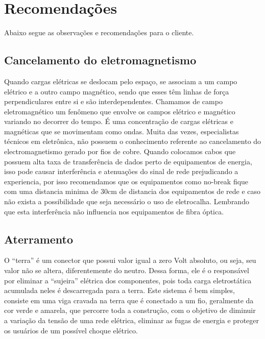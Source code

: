 \documentclass[	DIV=calc,%
							paper=a4,%
							fontsize=12pt,%
							onecolumn]{scrartcl}	 					%
\begin{document}



\section{Recomendações}
Abaixo segue as observações e recomendações para o cliente.

\subsection{Cancelamento do eletromagnetismo}
Quando cargas elétricas se deslocam pelo espaço, se associam a um campo elétrico e a outro campo magnético, sendo que esses têm linhas de força perpendiculares entre si e são interdependentes. Chamamos de campo eletromagnético um fenômeno que envolve os campos elétrico e magnético variando no decorrer do tempo. É uma concentração de cargas elétricas e magnéticas que se movimentam como ondas.  Muita das vezes, especialistas técnicos em eletrônica, não possuem o conhecimento referente ao cancelamento do electromagnetismo gerado por fios de cobre. Quando colocamos cabos que possuem alta taxa de transferência de dados perto de equipamentos de energia, isso pode causar interferência e atenuações do sinal de rede prejudicando a experiencia, por isso recomendamos que os equipamentos como no-break fique com uma distancia minima de 30cm de distancia dos equipamentos de rede e caso não exista a possibilidade que seja necessário o uso de eletrocalha. Lembrando que esta interferência não influencia nos equipamentos de fibra óptica.

\subsection{Aterramento}
O “terra” é um conector que possui valor igual a zero Volt absoluto, ou seja, seu valor não se altera, diferentemente do neutro. Dessa forma, ele é o responsável por eliminar a “sujeira” elétrica dos componentes, pois toda carga eletrostática acumulada neles é descarregada para a terra. Este sistema é bem simples, consiste em uma viga cravada na terra que é conectado a um fio, geralmente da cor verde e amarela, que percorre toda a construção, com o objetivo de diminuir a variação da tensão de uma rede elétrica, eliminar as fugas de energia e proteger os usuários de um possível choque elétrico.
\end{document}
